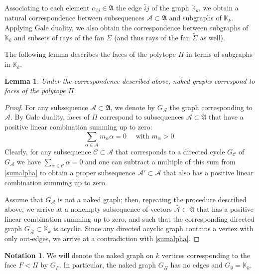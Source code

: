 \documentclass[11pt]{article}
\newtheorem{lemma}[theo]{Lemma}
\theoremstyle{definition}
\newtheorem{nota}[theo]{Notation}
\numberwithin{equation}{section}
\newcommand{\A}{\mathfrak{A}}
\begin{document}
Associating to each element $\alpha_{ij}\in \A $  the edge $\overleftarrow{ij}$ of the graph $\mathbb{K}_k$, we obtain a natural correspondence  between subsequences
$\mathcal{A}\subset\A$ and subgraphs of $\mathbb{K}_k$.  Applying Gale 
duality, we also obtain the correspondence 
between subgraphs of $\mathbb{K}_k$ and subsets of rays of the fan $\Sigma$ 
(and thus rays of the fan $\widetilde{\Sigma}$ as well). \label{corresp}


The following lemma describes the faces of the polytope $\Pi$ in terms of subgraphs in $\mathbb{K}_k$. 
\begin{lemma}\label{facegraphs}
Under the correspondence described above, naked graphs correspond to  faces of the polytope $\Pi$. 
\end{lemma}
\begin{proof}
For any subsequence $\mathcal{A}\subset\A$,  
we denote by $G_\mathcal{A}$ the graph 
corresponding to $\mathcal{A}$. 
By Gale duality, faces of $\Pi$ correspond to subsequences 
$\mathcal{A}\subset\A$  that have a positive linear combination summing up 
to zero:
\begin{equation}\label{sumalpha}
 \sum_{\alpha\in \mathcal{A}} m_{\alpha}\alpha = 0\quad\text{ with 
 }m_{\alpha}>0.
\end{equation}
Clearly, for any subsequence $\mathcal{C}\subset \mathcal{A}$ that corresponds 
to a directed cycle $G_\mathcal{C}$  of $G_\mathcal{A}$ we have 
$\sum_{\alpha\in \mathcal{C}} \alpha=0$ and one can subtract a multiple of this 
sum from \eqref{sumalpha} to obtain a proper subsequence 
$\mathcal{A}'\subset\mathcal{A}$ that also has a positive linear combination summing up to zero.

Assume that $G_\mathcal{A}$ is not a naked graph; then, repeating the procedure 
described above, we arrive at a nonempty subsequence of vectors 
$\bar{\mathcal{A}}\subset\A$ that has a positive linear combination summing up 
to zero, 
and such that the corresponding 
directed graph $G_{\bar{\mathcal{A}}}\subset \mathbb{K}_k$ is acyclic. Since 
any directed acyclic graph contains a vertex with only out-edges, we arrive at 
a  contradiction with \eqref{sumalpha}. 
\end{proof}

\begin{nota}\label{not:naked} We will denote the naked graph on  
$k$ vertices corresponding to the face $F<\Pi$ by $G_F$.  In particular, the naked graph $G_\Pi$ has no edges and $G_\emptyset=\mathbb{K}_k$.  
\end{nota}
\end{document}
